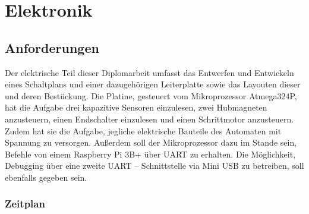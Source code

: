 \chapter{Elektronik}


\section{Anforderungen}

Der elektrische Teil dieser Diplomarbeit umfasst das Entwerfen und Entwickeln eines Schaltplans und einer dazugehörigen Leiterplatte sowie das Layouten dieser und deren Bestückung.
Die Platine, gesteuert vom Mikroprozessor Atmega324P, hat die Aufgabe drei kapazitive Sensoren einzulesen, zwei Hubmagneten anzusteuern, einen Endschalter einzulesen und einen Schrittmotor anzusteuern.
Zudem hat sie die Aufgabe, jegliche elektrische Bauteile des Automaten mit Spannung zu versorgen.
Außerdem soll der Mikroprozessor dazu im Stande sein, Befehle von einem Raspberry Pi 3B+ über UART zu erhalten.
Die Möglichkeit, Debugging über eine zweite UART – Schnittstelle via Mini USB zu betreiben, soll ebenfalls gegeben sein.

\subsection{Zeitplan}

